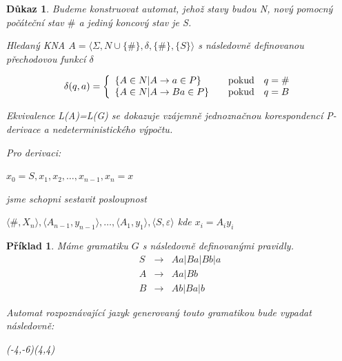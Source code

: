 \documentclass[10pt, a4paper, titlepage]{article}
\theoremstyle{note}
\newtheorem{dukaz}{\textbf{Důkaz}}
\newtheorem{priklad}{\textbf{Příklad}}
\begin{document}
\begin{dukaz}
Budeme konstruovat automat, jehož stavy budou \textit{N}, nový pomocný počáteční stav $ \# $ a jediný koncový stav je \textit{S}.

Hledaný KNA $ A = \langle \Sigma,N \cup \lbrace \# \rbrace,\delta,\lbrace \# \rbrace,\lbrace S \rbrace \rangle$ s následovně definovanou přechodovou funkcí $\delta$

$$
\delta(q,a)=\left\{
\begin{array}{l@{\quad\mbox{}\quad}l}
\lbrace A \in N | A \rightarrow a \in P \rbrace & \text{pokud}\quad q=\#\\
\lbrace A \in N | A \rightarrow Ba \in P \rbrace & \text{pokud}\quad q=B\\
\end{array}
\right.
$$ 

Ekvivalence \textit{L(A)=L(G)} se dokazuje vzájemně jednoznačnou korespondencí P-derivace a nedeterministického výpočtu.

Pro derivaci:

$ x_0=S,x_1,x_2,\ldots,x_{n-1},x_n=x $

jsme schopni sestavit posloupnost

$ \langle \# , X_n \rangle,\langle A_{n-1} , y_{n-1} \rangle,\ldots,\langle A_1 , y_1 \rangle,\langle S , \varepsilon \rangle $ kde $x_i=A_{i}y_{i}$
\end{dukaz}

\begin{priklad}
Máme gramatiku $G$ s následovně definovanými pravidly.
\begin{eqnarray*}
S &\rightarrow& Aa|Ba|Bb|a \\
A &\rightarrow& Aa|Bb \\
B &\rightarrow& Ab|Ba|b
\end{eqnarray*}

Automat rozpoznávající jazyk generovaný touto gramatikou bude vypadat následovně:

\begin{center}
\begin{VCPicture}{(-4,-6)(4,4)}
\end{VCPicture}
\end{center}

\end{priklad}
\end{document}
